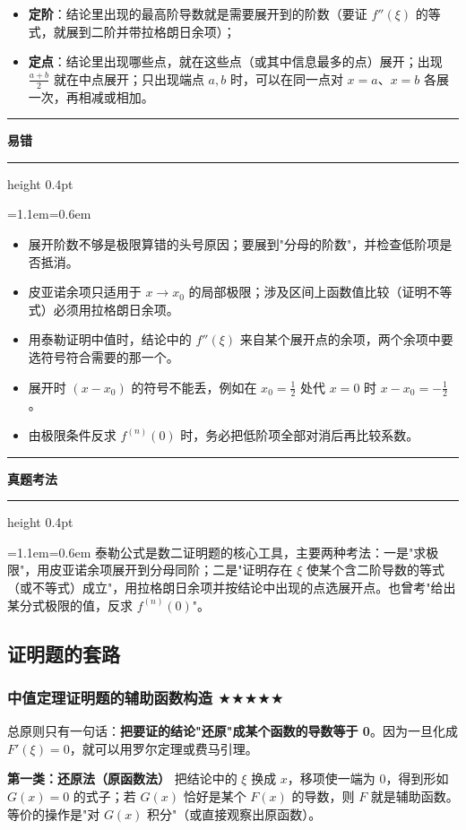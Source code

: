 \documentclass[11pt,openany,UTF8]{ctexbook}
\newcommand{\callouthead}[2]{%
  \par\addvspace{7pt}\noindent
  {\color{#1}\rule[-0.15em]{3pt}{1.05em}}\hspace{0.5em}%
  {\bfseries\color{#1}#2}\par\nobreak\vspace{-0.35em}%
  {\color{rulesep}\hrule height 0.4pt}\nobreak\vspace{0.45em}%
  \begingroup\small\setlength{\parindent}{0pt}%
  \leftskip=1.1em\rightskip=0.6em\noindent\ignorespaces}
\newcommand{\calloutend}{\par\endgroup\addvspace{7pt}}
\newenvironment{callwarn}[1]{\callouthead{warnbar}{#1}}{\calloutend}
\newenvironment{callexam}[1]{\callouthead{exambar}{#1}}{\calloutend}
\begin{document}
\begin{itemize}
\item \textbf{定阶}：结论里出现的最高阶导数就是需要展开到的阶数（要证 $f''(\xi)$ 的等式，就展到二阶并带拉格朗日余项）；
\item \textbf{定点}：结论里出现哪些点，就在这些点（或其中信息最多的点）展开；出现 $\frac{a+b}{2}$ 就在中点展开；只出现端点 $a,b$ 时，可以在同一点对 $x=a$、$x=b$ 各展一次，再相减或相加。
\end{itemize}
\begin{callwarn}{易错}
\begin{itemize}
\item 展开阶数不够是极限算错的头号原因；要展到"分母的阶数"，并检查低阶项是否抵消。
\item 皮亚诺余项只适用于 $x\to x_0$ 的局部极限；涉及区间上函数值比较（证明不等式）必须用拉格朗日余项。
\item 用泰勒证明中值时，结论中的 $f''(\xi)$ 来自某个展开点的余项，两个余项中要选符号符合需要的那一个。
\item 展开时 $(x-x_0)$ 的符号不能丢，例如在 $x_0=\frac12$ 处代 $x=0$ 时 $x-x_0=-\frac12$。
\item 由极限条件反求 $f^{(n)}(0)$ 时，务必把低阶项全部对消后再比较系数。
\end{itemize}
\end{callwarn}

\begin{callexam}{真题考法}
泰勒公式是数二证明题的核心工具，主要两种考法：一是"求极限"，用皮亚诺余项展开到分母同阶；二是"证明存在 $\xi$ 使某个含二阶导数的等式（或不等式）成立"，用拉格朗日余项并按结论中出现的点选展开点。也曾考"给出某分式极限的值，反求 $f^{(n)}(0)$"。

\end{callexam}

\subsection{证明题的套路}

\subsubsection{中值定理证明题的辅助函数构造 $\bigstar$$\bigstar$$\bigstar$$\bigstar$$\bigstar$}

总原则只有一句话：\textbf{把要证的结论"还原"成某个函数的导数等于 0}。因为一旦化成 $F'(\xi)=0$，就可以用罗尔定理或费马引理。

\textbf{第一类：还原法（原函数法）} 把结论中的 $\xi$ 换成 $x$，移项使一端为 0，得到形如 $G(x)=0$ 的式子；若 $G(x)$ 恰好是某个 $F(x)$ 的导数，则 $F$ 就是辅助函数。等价的操作是"对 $G(x)$ 积分"（或直接观察出原函数）。
\end{document}
